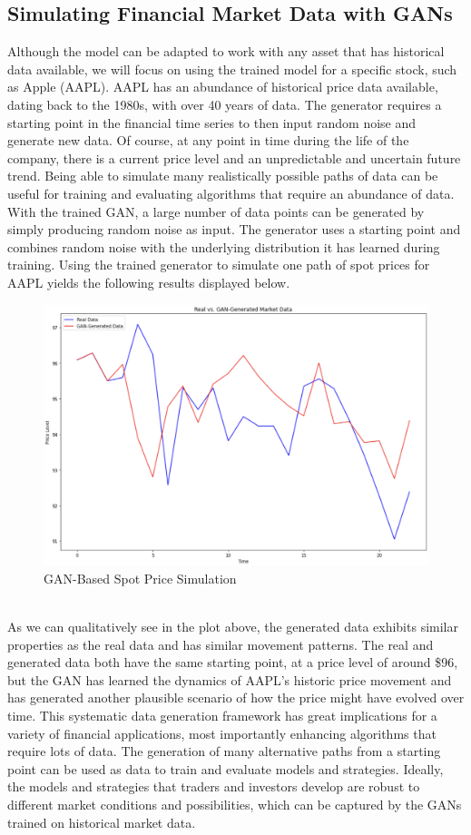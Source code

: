 \subsection{Simulating Financial Market Data with GANs}
Although the model can be adapted to work with any asset that has historical data available, we will focus on using the trained model for a specific stock, such as Apple (AAPL). AAPL has an abundance of historical price data available, dating back to the 1980s, with over 40 years of data. The generator requires a starting point in the financial time series to then input random noise and generate new data. Of course, at any point in time during the life of the company, there is a current price level and an unpredictable and uncertain future trend. Being able to simulate many realistically possible paths of data can be useful for training and evaluating algorithms that require an abundance of data. With the trained GAN, a large number of data points can be generated by simply producing random noise as input. The generator uses a starting point and combines random noise with the underlying distribution it has learned during training. Using the trained generator to simulate one path of spot prices for AAPL yields the following results displayed below.
\begin{figure}[h]
\centering
\includegraphics[width=14.5cm]{templates/assets/gan/gan_stable.png}
\caption{GAN-Based Spot Price Simulation}
\end{figure}
\\
\noindent As we can qualitatively see in the plot above, the generated data exhibits similar properties as the real data and has similar movement patterns. The real and generated data both have the same starting point, at a price level of around \$96, but the GAN has learned the dynamics of AAPL's historic price movement and has generated another plausible scenario of how the price might have evolved over time. This systematic data generation framework has great implications for a variety of financial applications, most importantly enhancing algorithms that require lots of data. The generation of many alternative paths from a starting point can be used as data to train and evaluate models and strategies. Ideally, the models and strategies that traders and investors develop are robust to different market conditions and possibilities, which can be captured by the GANs trained on historical market data.
